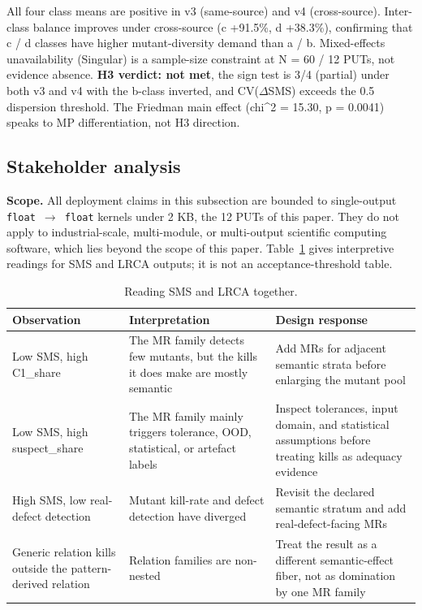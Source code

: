 \documentclass[manuscript,screen,review]{acmart}
\begin{document}
All four class means are positive in v3 (same-source) and v4
(cross-source). Inter-class balance improves under cross-source (c
+91.5\%, d +38.3\%), confirming that c / d classes have higher
mutant-diversity demand than a / b. Mixed-effects unavailability
(Singular) is a sample-size constraint at N = 60 / 12 PUTs, not evidence
absence. \textbf{H3 verdict: not met}, the sign test is 3/4 (partial)
under both v3 and v4 with the b-class inverted, and CV($\Delta$SMS)
exceeds the 0.5 dispersion threshold. The Friedman main effect (chi\^{}2 =
15.30, p = 0.0041) speaks to MP differentiation, not H3 direction.

\subsection{Stakeholder analysis}\label{stakeholder-analysis-single-output-kernels-scope}

\textbf{Scope.} All deployment claims in this subsection are bounded to
single-output \texttt{float\ $\to$\ float} kernels under 2 KB, the 12 PUTs
of this paper. They do not apply to industrial-scale, multi-module, or
multi-output scientific computing software, which lies beyond the scope of this paper.
Table~\ref{tab:sms-lrca-reading} gives interpretive readings for SMS and
LRCA outputs; it is not an acceptance-threshold table.

{%
\begin{longtable}[]{@{}
  >{\raggedright\arraybackslash}p{}
  >{\raggedright\arraybackslash}p{}
  >{\raggedright\arraybackslash}p{}@{}}
\caption{Reading SMS and LRCA together.}\label{tab:sms-lrca-reading}\\
\toprule\noalign{}
Observation & Interpretation & Design response \\
\midrule\noalign{}
\endfirsthead
\endhead
\bottomrule\noalign{}
\endlastfoot
Low SMS, high C1\_share & The MR family detects few mutants, but the
kills it does make are mostly semantic & Add MRs for adjacent semantic
strata before enlarging the mutant pool \\
Low SMS, high suspect\_share & The MR family mainly triggers tolerance,
OOD, statistical, or artefact labels & Inspect tolerances, input domain,
and statistical assumptions before treating kills as adequacy evidence \\
High SMS, low real-defect detection & Mutant kill-rate and defect
detection have diverged & Revisit the declared semantic stratum and add
real-defect-facing MRs \\
Generic relation kills outside the pattern-derived relation & Relation
families are non-nested & Treat the result as a different
semantic-effect fiber, not as domination by one MR family \\
\end{longtable}
}
\end{document}
